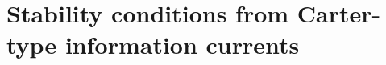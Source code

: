 \documentclass[
a4paper,
amsfonts,
amsmath,
reprint,
showkeys,
nofootinbib,
twoside,
onecolumn,
notitlepage
]{revtex4-1}
\begin{document}
	
	
	\section{Stability conditions from Carter-type information currents}\label{app:carter-ic}
	
\end{document}
